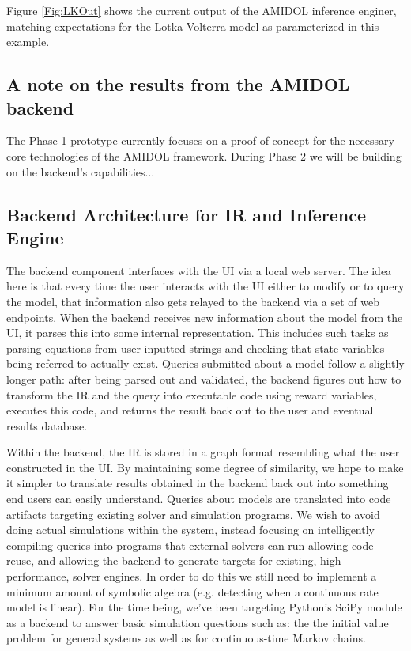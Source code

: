 \documentclass[11pt]{article}
\newcommand{\amidol}{\textsc{AMIDOL}}
\begin{document}
Figure \ref{Fig:LKOut} shows the current output of the \amidol{} inference enginer, matching expectations for the Lotka-Volterra model as parameterized in this example.

\subsection{A note on the results from the \amidol{} backend}

The Phase 1 prototype currently focuses on a proof of concept for the necessary core technologies of the \amidol{} framework.  During Phase 2 we will be building on the backend's capabilities...

\subsection{Backend Architecture for IR and Inference Engine}

The backend component interfaces with the UI via a local web server. The idea here is that every time the user interacts with the UI either to modify or to query the model, that information also gets relayed to the backend via a set of web endpoints. When the backend receives new information about the model from the UI, it parses this into some internal representation. This includes such tasks as parsing equations from user-inputted strings and checking that state variables being referred to actually exist. Queries submitted about a model follow a slightly longer path: after being parsed out and validated, the backend figures out how to transform the IR and the query into executable code using reward variables, executes this code, and returns the result back out to the user and eventual results database.

Within the backend, the IR is stored in a graph format resembling what the user constructed in the UI. By maintaining some degree of similarity, we hope to make it simpler to translate results obtained in the backend back out into something end users can easily understand. Queries about models are translated into code artifacts targeting existing solver and simulation programs. We wish to avoid doing actual simulations within the system, instead focusing on intelligently compiling queries into programs that external solvers can run allowing code reuse, and allowing the backend to generate targets for existing, high performance, solver engines. In order to do this we still need to implement a minimum amount of symbolic algebra (e.g. detecting when a continuous rate  model is linear). For the time being, we’ve been targeting Python’s SciPy module as a backend to answer basic simulation questions such as: the the initial value problem for general systems as well as for continuous-time Markov chains.
\end{document}
